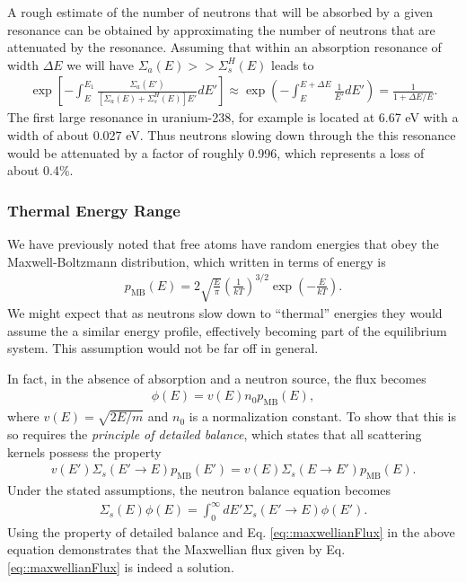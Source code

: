 \documentclass[11pt]{article}
\begin{document}
A rough estimate of the number of neutrons that will be absorbed by a given resonance can be obtained by approximating the number of neutrons that are attenuated by the resonance.  Assuming that within an absorption resonance of width \(\Delta E\) we will have \(\Sigma_a(E) >> \Sigma_s^H(E)\) leads to
\begin{align}
  \exp\left[ -\int_E^{E_1} \frac{\Sigma_a(E')}{\left[ \Sigma_a(E) + \Sigma_s^H(E) \right] E'} dE' \right]
  \approx \exp\left( -\int_E^{E+\Delta E} \frac{1}{E'} dE' \right)
  = \frac{1}{1+\Delta E/E}.
\end{align}
The first large resonance in uranium-238, for example is located at 6.67 eV with a width of about 0.027 eV.  Thus neutrons slowing down through the this resonance would be attenuated by a factor of roughly 0.996, which represents a loss of about 0.4\%.

\subsubsection{Thermal Energy Range}
\label{sec:orgheadline31}
We have previously noted that free atoms have random energies that obey the Maxwell-Boltzmann distribution, which written in terms of energy is
\begin{align}
  p_\text{MB}(E) = 2 \sqrt{\frac{E}{\pi}} \left( \frac{1}{kT} \right)^{3/2} \exp\left( - \frac{E}{kT} \right).
\end{align}
We might expect that as neutrons slow down to ``thermal'' energies they would assume the a similar energy profile, effectively becoming part of the equilibrium system.  This assumption would not be far off in general.

In fact, in the absence of absorption and a neutron source, the flux becomes
\begin{align}
  \label{eq::maxwellianFlux}
  \phi(E) = v(E) n_0 p_\text{MB}(E),
\end{align}
where \(v(E) = \sqrt{2E/m}\) and \(n_0\) is a normalization constant.  To show that this is so requires the \emph{principle of detailed balance}, which states that all scattering kernels possess the property
\begin{align}
  v(E') \Sigma_s(E' \rightarrow E) p_\text{MB}(E') = v(E) \Sigma_s(E \rightarrow E') p_\text{MB}(E).
\end{align}
Under the stated assumptions, the neutron balance equation becomes
\begin{align}
  \Sigma_s(E) \phi(E) = \int_0^\infty dE' \Sigma_s(E' \rightarrow E ) \phi(E').
\end{align}
Using the property of detailed balance and Eq. \eqref{eq::maxwellianFlux} in the above equation demonstrates that the Maxwellian flux given by Eq. \eqref{eq::maxwellianFlux} is indeed a solution.
\end{document}
